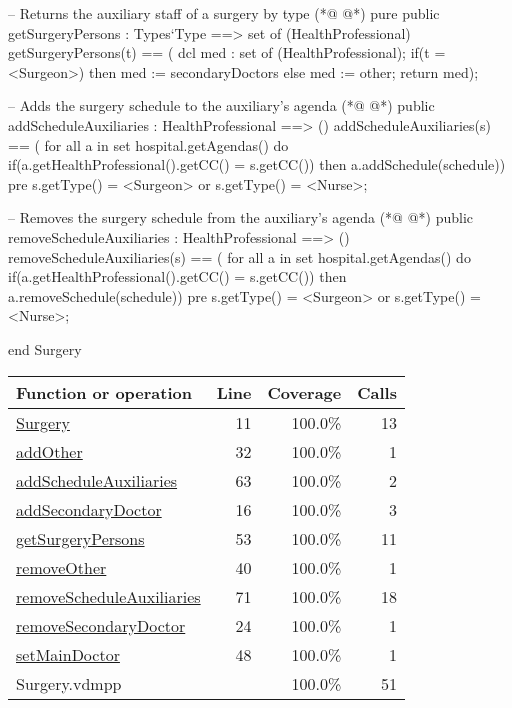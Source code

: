 \begin{vdmpp}[breaklines=true]
 -- Returns the auxiliary staff of a surgery by type
(*@
\label{getSurgeryPersons:53}
@*)
 pure public getSurgeryPersons : Types`Type ==> set of (HealthProfessional)
  getSurgeryPersons(t) == (
               dcl med : set of (HealthProfessional);
               if(t = <Surgeon>)
                then med := secondaryDoctors
               else
                med := other;
               return med);
 
 -- Adds the surgery schedule to the auxiliary's agenda            
(*@
\label{addScheduleAuxiliaries:63}
@*)
 public addScheduleAuxiliaries : HealthProfessional ==> ()
  addScheduleAuxiliaries(s) == (
   for all a in set hospital.getAgendas() do
    if(a.getHealthProfessional().getCC() = s.getCC())
     then a.addSchedule(schedule))
 pre s.getType() = <Surgeon> or s.getType() = <Nurse>;
 
 -- Removes the surgery schedule from the auxiliary's agenda
(*@
\label{removeScheduleAuxiliaries:71}
@*)
 public removeScheduleAuxiliaries : HealthProfessional ==> ()
  removeScheduleAuxiliaries(s) == (
   for all a in set hospital.getAgendas() do
    if(a.getHealthProfessional().getCC() = s.getCC())
     then a.removeSchedule(schedule))
 pre s.getType() = <Surgeon> or s.getType() = <Nurse>;
 
end Surgery
\end{vdmpp}
\bigskip
\begin{longtable}{|l|r|r|r|}
\hline
Function or operation & Line & Coverage & Calls \\
\hline
\hline
\hyperref[Surgery:11]{Surgery} & 11&100.0\% & 13 \\
\hline
\hyperref[addOther:32]{addOther} & 32&100.0\% & 1 \\
\hline
\hyperref[addScheduleAuxiliaries:63]{addScheduleAuxiliaries} & 63&100.0\% & 2 \\
\hline
\hyperref[addSecondaryDoctor:16]{addSecondaryDoctor} & 16&100.0\% & 3 \\
\hline
\hyperref[getSurgeryPersons:53]{getSurgeryPersons} & 53&100.0\% & 11 \\
\hline
\hyperref[removeOther:40]{removeOther} & 40&100.0\% & 1 \\
\hline
\hyperref[removeScheduleAuxiliaries:71]{removeScheduleAuxiliaries} & 71&100.0\% & 18 \\
\hline
\hyperref[removeSecondaryDoctor:24]{removeSecondaryDoctor} & 24&100.0\% & 1 \\
\hline
\hyperref[setMainDoctor:48]{setMainDoctor} & 48&100.0\% & 1 \\
\hline
\hline
Surgery.vdmpp & & 100.0\% & 51 \\
\hline
\end{longtable}

